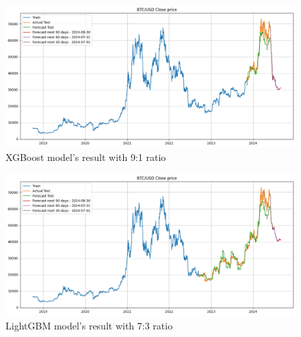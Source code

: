 \documentclass{ieeeojies}
\begin{document}
\begin{figure}[H]
    \centering 
    \includegraphics[width=0.8\linewidth]{./././visualize/XGBoost/BTC-90-10.png} 
    \caption{XGBoost model’s result with 9:1 ratio}
    \label{fig:19}
\end{figure}
\begin{figure}[H]
    \centering 
    \includegraphics[width=0.8\linewidth]{./././visualize/LightGBM/BTC-70-30.png} 
    \caption{LightGBM model’s result with 7:3 ratio}
    \label{fig:20}
\end{figure}
\end{document}
